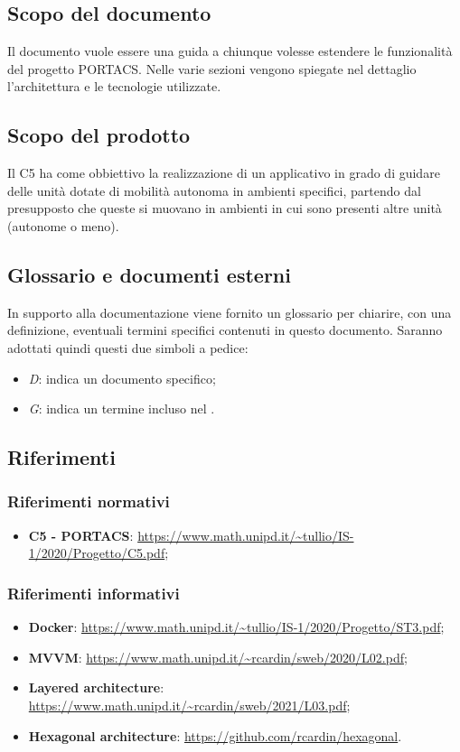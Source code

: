 \subsection{Scopo del documento}
	Il documento vuole essere una guida a chiunque volesse estendere le funzionalità del progetto PORTACS. Nelle varie sezioni vengono spiegate nel dettaglio l'architettura e le tecnologie utilizzate.

\subsection{Scopo del prodotto}
	Il  C5 ha come obbiettivo la realizzazione di un applicativo  in grado di guidare delle unità dotate di mobilità autonoma in ambienti specifici, partendo dal presupposto che queste si muovano in ambienti in cui sono presenti altre unità (autonome o meno).

\subsection{Glossario e documenti esterni}
	In supporto alla documentazione viene fornito un glossario per chiarire, con una definizione, eventuali termini specifici contenuti in questo documento.
	Saranno adottati quindi questi due simboli a pedice:
	\begin{itemize}
		\item \textit{D}: indica un documento specifico;
		\item \textit{G}: indica un termine incluso nel .
	\end{itemize}

\subsection{Riferimenti}
	\subsubsection{Riferimenti normativi}
	\begin{itemize}
		\item \textbf{{ C5 - PORTACS}}: \url{https://www.math.unipd.it/~tullio/IS-1/2020/Progetto/C5.pdf};
	\end{itemize}
	\subsubsection{Riferimenti informativi}
	\begin{itemize}
		\item \textbf{Docker}: \url{https://www.math.unipd.it/~tullio/IS-1/2020/Progetto/ST3.pdf};
		\item \textbf{MVVM}: \url{https://www.math.unipd.it/~rcardin/sweb/2020/L02.pdf};
		\item \textbf{Layered architecture}: \url{https://www.math.unipd.it/~rcardin/sweb/2021/L03.pdf};
		\item \textbf{Hexagonal architecture}: \url{https://github.com/rcardin/hexagonal}.
	\end{itemize}
